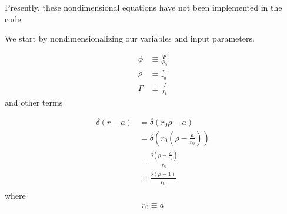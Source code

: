 \documentclass{article}
\begin{document}
Presently, these nondimensional equations have not been implemented in the code.

We start by nondimensionalizing our variables and input parameters.  

\begin{equation} \label{wessonCurrentProfile}
\begin{split}
\phi&\equiv\frac{\Psi}{\Psi_0} \\
\rho&\equiv\frac{r}{r_0} \\
\Gamma&\equiv\frac{J}{J_1}
\end{split} 
\end{equation} 
and other terms

\begin{equation} \label{wessonCurrentProfile}
\begin{split}
\delta(r-a) & = \delta(r_0 \rho - a) \\
& = \delta\left(r_0(\rho-\frac{a}{r_0})\right)\\
& = \frac{\delta\left(\rho-\frac{a}{r_0}\right)}{r_0}\\
& = \frac{\delta\left(\rho-1\right)}{r_0}\\
\end{split} 
\end{equation} 
where 
\begin{equation} \label{wessonCurrentProfile}
\begin{split}
r_0 \equiv a
\end{split} 
\end{equation} 
\end{document}
